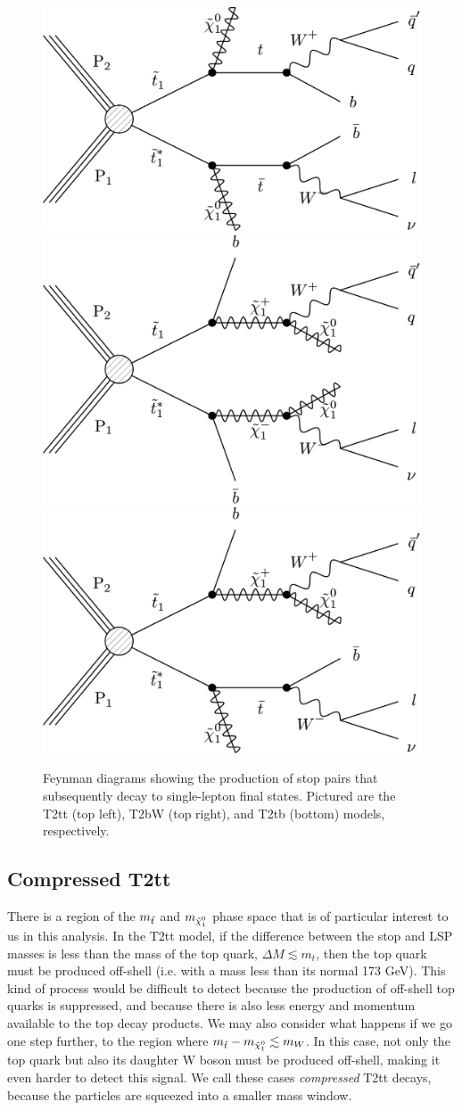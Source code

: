 \begin{figure}[htb]
\centering
\includegraphics[width=0.45\linewidth]{figures/feynmandiagram_T2tt.pdf}
\includegraphics[width=0.45\linewidth]{figures/feynmandiagram_T2bw.pdf}
\includegraphics[width=0.45\linewidth]{figures/feynmandiagram_T2tb.pdf}
\caption{Feynman diagrams showing the production of stop pairs that
  subsequently decay to single-lepton final states. Pictured are the
  T2tt (top left), T2bW (top right), and T2tb (bottom) models, respectively.}
\label{fig:stop:feynmandiagrams}
\end{figure}

\subsection{Compressed T2tt}
\label{ssec:stop:sigcompressed}

There is a region of the $m_{\tilde{t}}$ and $m_{\tilde{\chi}^0_1}$ phase space
that is of particular interest to us in this analysis. In the T2tt
model, if the difference between the stop and LSP masses is less than
the mass of the top quark, $\Delta M \lesssim m_t$, then the top quark
must be produced off-shell (i.e. with a mass less than its normal
173 GeV). This kind of process would be difficult to detect
because the production of off-shell top quarks is suppressed, and
because there is also less energy and momentum available to the top
decay products. We may also consider what happens if we go one step
further, to the region where $m_{\tilde{t}} - m_{\tilde{\chi}^0_1} \lesssim m_W$. In this case, not
only the top quark but also its daughter W boson must be produced
off-shell, making it even harder to detect this signal. We call these
cases \emph{compressed} T2tt decays, because the particles are
squeezed into a smaller mass window.


